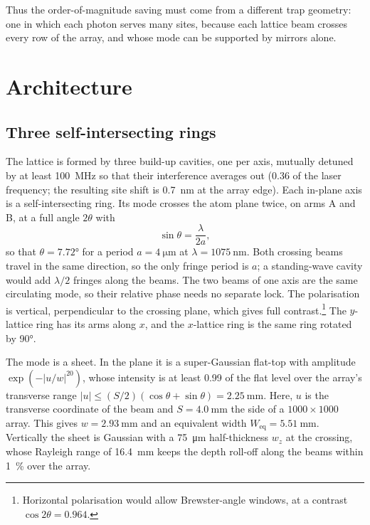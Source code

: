 \documentclass[11pt]{article}
\begin{document}
Thus the order-of-magnitude saving must come from a different trap geometry: one in which each
photon serves many sites, because each lattice beam crosses every row of the array, and whose mode
can be supported by mirrors alone.

\section{Architecture}
\label{sec:architecture}

\subsection{Three self-intersecting rings}

The lattice is formed by three build-up cavities, one per axis, mutually detuned by at least
\SI{100}{\mega\hertz} so that their interference averages out (\SI{0.36}{\ppm} of the laser
frequency; the resulting site shift is \SI{0.7}{\nano\metre} at the array edge). Each in-plane axis
is a self-intersecting ring. Its mode crosses the atom plane twice, on arms A and B, at a full angle
$2\theta$ with
\begin{equation}
  \sin\theta = \frac{\lambda}{2a},
  \label{eq:period}
\end{equation}
so that $\theta = \ang{7.72}$ for a period $a = \SI{4}{\micro\metre}$ at $\lambda = \SI{1075}{\nano\metre}$.
Both crossing beams travel in the same direction, so the only fringe period is $a$; a standing-wave
cavity would add $\lambda/2$ fringes along the beams. The two beams of one axis are the same
circulating mode, so their relative phase needs no separate lock. The polarisation is vertical,
perpendicular to the crossing plane, which gives full contrast.\footnote{Horizontal polarisation
would allow Brewster-angle windows, at a contrast $\cos 2\theta = 0.964$.} The $y$-lattice ring has
its arms along $x$, and the $x$-lattice ring is the same ring rotated by \ang{90}.

The mode is a sheet. In the plane it is a super-Gaussian flat-top with amplitude
$\exp(-|u/w|^{20})$, whose intensity is at least 0.99 of the flat level over the array's transverse
range $|u| \le (S/2)(\cos\theta + \sin\theta) = \SI{2.25}{\milli\metre}$. Here, $u$ is the transverse
coordinate of the beam and $S = \SI{4.0}{\milli\metre}$ the side of a $1000 \times 1000$ array. This
gives $w = \SI{2.93}{\milli\metre}$ and an equivalent width $W_\mathrm{eq} = \SI{5.51}{\milli\metre}$.
Vertically the sheet is Gaussian with a \SI{75}{\micro\metre} half-thickness $w_z$ at the crossing,
whose Rayleigh range of \SI{16.4}{\milli\metre} keeps the depth roll-off along the beams within
\SI{1}{\percent} over the array.
\end{document}
